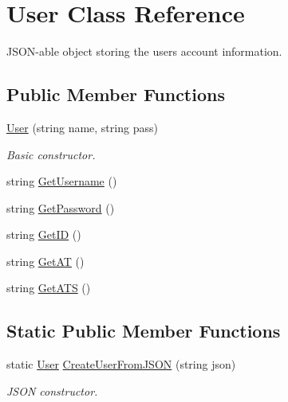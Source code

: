 \hypertarget{class_user}{}\section{User Class Reference}
\label{class_user}


J\+S\+O\+N-\/able object storing the user\textquotesingle{}s account information.  


\subsection*{Public Member Functions}
\begin{DoxyCompactItemize}
\item 
\mbox{\hyperlink{class_user_a340ae260388cc9beadce82a506e3fe39}{User}} (string name, string pass)
\begin{DoxyCompactList}\small\item\em Basic constructor. \end{DoxyCompactList}\item 
string \mbox{\hyperlink{class_user_a9b01c32e62c89a10e380f6cdfa19b8b0}{Get\+Username}} ()
\item 
string \mbox{\hyperlink{class_user_a19477827d4e7de7ed4e1c3356aec3e81}{Get\+Password}} ()
\item 
string \mbox{\hyperlink{class_user_a91e7a9a20ab853c8291c19e3b607ddeb}{Get\+ID}} ()
\item 
string \mbox{\hyperlink{class_user_a208b67765760712a54a3c354f351ab34}{Get\+AT}} ()
\item 
string \mbox{\hyperlink{class_user_ab1bd8f0f2b784942840ab712e61a3979}{Get\+A\+TS}} ()
\end{DoxyCompactItemize}
\subsection*{Static Public Member Functions}
\begin{DoxyCompactItemize}
\item 
static \mbox{\hyperlink{class_user}{User}} \mbox{\hyperlink{class_user_ab083d14c7cefbeb5eb91eb9ebb21a3bd}{Create\+User\+From\+J\+S\+ON}} (string json)
\begin{DoxyCompactList}\small\item\em J\+S\+ON constructor. \end{DoxyCompactList}\end{DoxyCompactItemize}
